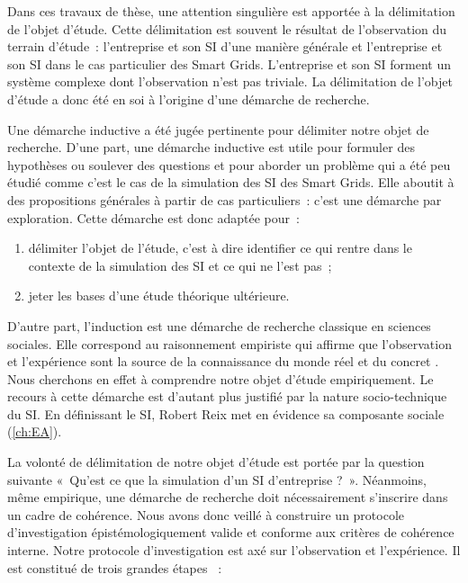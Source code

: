 Dans ces travaux de thèse, une attention singulière est apportée à la délimitation de l'objet d'étude. 
Cette délimitation est souvent le résultat de l'observation du terrain d'étude~: 
l'entreprise et son SI d'une manière générale et l'entreprise et son SI dans le 
cas particulier des Smart Grids. L'entreprise et son SI forment un système 
complexe dont l'observation n'est pas triviale. La délimitation de l'objet 
d'étude a donc été en soi à l'origine d'une démarche de recherche.
	
	Une démarche inductive a été jugée pertinente pour délimiter notre objet de recherche. D'une part, une démarche inductive est utile pour formuler des hypothèses ou soulever des questions et pour aborder 
un problème qui a été peu étudié comme c'est le cas de la simulation des SI des Smart Grids. 
Elle aboutit à des propositions générales à partir de cas particuliers~: c'est 
une démarche par exploration. 
	Cette démarche est donc adaptée pour~: 
	\begin{enumerate}
	\item délimiter l'objet de l'étude, c'est à dire identifier ce qui rentre dans le 
contexte de la simulation des SI et ce qui ne l'est pas~;
	\item jeter les bases d'une étude théorique ultérieure.
	\end{enumerate}
	
	D'autre part, l'induction est une démarche de recherche classique en sciences 
sociales. Elle correspond au raisonnement empiriste qui affirme que 
l'observation et l'expérience sont la source de la connaissance du monde réel et 
du concret \cite{madeleine2001methodes}. Nous cherchons en effet à comprendre 
notre objet d'étude empiriquement. Le recours à cette démarche est d'autant plus 
justifié par la nature socio-technique du SI. En définissant le SI, Robert Reix 
met en évidence sa composante sociale (\ref{ch:EA}). 
	

	La volonté de délimitation de notre objet d'étude est portée par la question 
suivante «~Qu'est ce que la simulation d'un SI d'entreprise ?~». Néanmoins, même 
empirique, une démarche de recherche doit nécessairement s'inscrire dans un 
cadre de cohérence. Nous avons donc veillé à construire un protocole 
d'investigation épistémologiquement valide et conforme aux critères de cohérence 
interne. Notre protocole d'investigation est axé sur l'observation et 
l'expérience. Il est constitué de trois grandes étapes ~:
		

